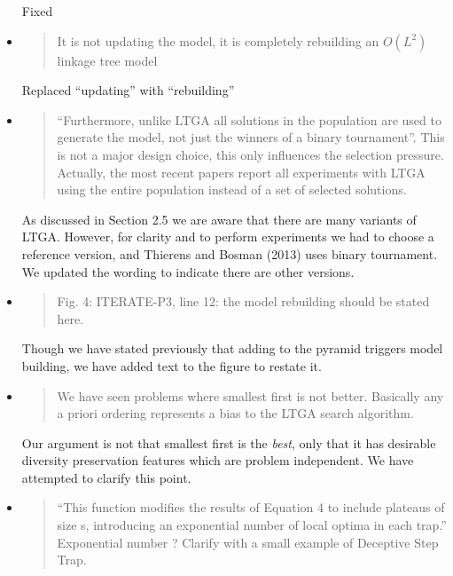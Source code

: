 \documentclass[]{article}
\begin{document}
\begin{itemize}
Fixed

\item
\begin{quote}
It is not updating the model, it is completely rebuilding an $O(L^2)$ linkage tree model 
\end{quote}

Replaced ``updating'' with ``rebuilding''

\item
\begin{quote}
``Furthermore, unlike LTGA all solutions in the population are used to generate the model, not just the winners of a binary tournament''.
This is not a major design choice, this only influences the selection pressure. Actually, the most recent papers report all experiments with LTGA using the entire population instead of a set of selected solutions.
\end{quote}

As discussed in Section 2.5 we are aware that there are many variants of LTGA. However, for clarity and to perform experiments we had to choose a reference version, and Thierens and Bosman (2013) uses binary tournament. We updated the wording to indicate there are other versions.

\item
\begin{quote}
Fig. 4: ITERATE-P3, line 12: the model rebuilding should be stated here.
\end{quote}

Though we have stated previously that adding to the pyramid triggers model building, we have added text to the figure to restate it.

\item
\begin{quote}
We have seen problems where smallest first is not better. Basically any a priori ordering represents a bias to the LTGA search algorithm.
\end{quote}

Our argument is not that smallest first is the \textit{best}, only that it has desirable diversity preservation features which are problem independent. We have attempted to clarify this point.

\item
\begin{quote}
 ``This function modifies the results of Equation 4 to include plateaus of size s, introducing an exponential number of local optima in each trap.''
Exponential number ? Clarify with a small example of Deceptive Step Trap.
\end{quote}


\end{itemize}
\end{document}
